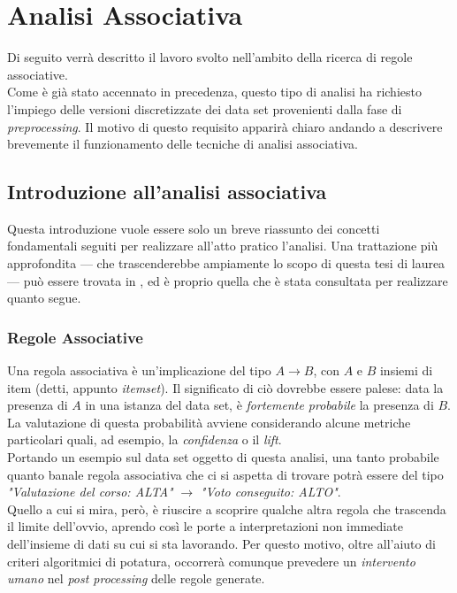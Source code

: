 \chapter{Analisi Associativa}
\label{ch:ass}

Di seguito verrà descritto il lavoro svolto nell'ambito della ricerca di regole associative. \\

Come è già stato accennato in precedenza, questo tipo di analisi ha richiesto l'impiego delle versioni discretizzate dei data set provenienti dalla fase di \textit{preprocessing}. Il motivo di questo requisito apparirà chiaro andando a descrivere brevemente il funzionamento delle tecniche di analisi associativa.

\section{Introduzione all'analisi associativa}

    Questa introduzione vuole essere solo un breve riassunto dei concetti fondamentali seguiti per realizzare all'atto pratico l'analisi. Una trattazione più approfondita --- che trascenderebbe  ampiamente lo scopo di questa tesi di laurea --- può essere trovata in \cite{dispense}, ed è proprio quella che è stata consultata per realizzare quanto segue.

    \subsection{Regole Associative}

        Una regola associativa è un'implicazione del tipo $A \rightarrow B$, con $A$ e $B$ insiemi di item (detti, appunto \textit{itemset}). Il significato di ciò dovrebbe essere palese: data la presenza di $A$ in una istanza del data set, è \textit{fortemente probabile} la presenza di $B$. La valutazione di questa probabilità avviene considerando alcune metriche particolari quali, ad esempio, la \textit{confidenza} o il \textit{lift}. \\

        Portando un esempio sul data set oggetto di questa analisi, una tanto probabile quanto banale regola associativa che ci si aspetta di trovare potrà essere del tipo \textit{"Valutazione del corso: ALTA"} $\rightarrow$ \textit{"Voto conseguito: ALTO"}. \\

        Quello a cui si mira, però, è riuscire a scoprire qualche altra regola che trascenda il limite dell'ovvio, aprendo così le porte a interpretazioni non immediate dell'insieme di dati su cui si sta lavorando. Per questo motivo, oltre all'aiuto di criteri algoritmici di potatura, occorrerà comunque prevedere un \textit{intervento umano} nel \textit{post processing} delle regole generate.

